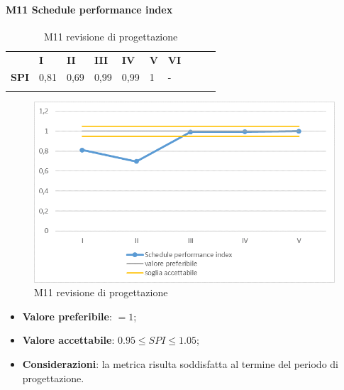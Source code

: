 \paragraph{M11 Schedule performance index} \mbox{}
\begin{longtable}[H!] {						
		>{}p{50mm}  		
		>{}p{8mm}
		>{}p{8mm}		
		>{}p{8mm}		
		>{}p{8mm}		
		>{}p{8mm}		
		>{}p{8mm}
		>{}p{8mm}
		>{}p{8mm}
		>{}p{8mm}
	}
	\rowcolor{gray!50}
	\textbf{} & \textbf{I} & \textbf{II} & \textbf{III} & \textbf{IV} & \textbf{V} & \textbf{VI} \TBstrut \\ [2mm]
	\textbf{SPI} & 0,81 & 0,69 & 0,99 & 0,99 & 1 & - \TBstrut \\ [2mm]
	\rowcolor{white}
	\caption{M11 revisione di progettazione}
\end{longtable}
\begin{figure}[H] 	
\includegraphics[width=\linewidth]{./img/grafici/RP8.png}	
\caption{M11 revisione di progettazione}	
\end{figure}
\begin{itemize}
	\item \textbf{Valore preferibile}: $=1$;
	\item \textbf{Valore accettabile}: $0.95 \le SPI \le 1.05$;
	\item \textbf{Considerazioni}: la metrica risulta soddisfatta al termine del periodo di progettazione.
\end{itemize}
